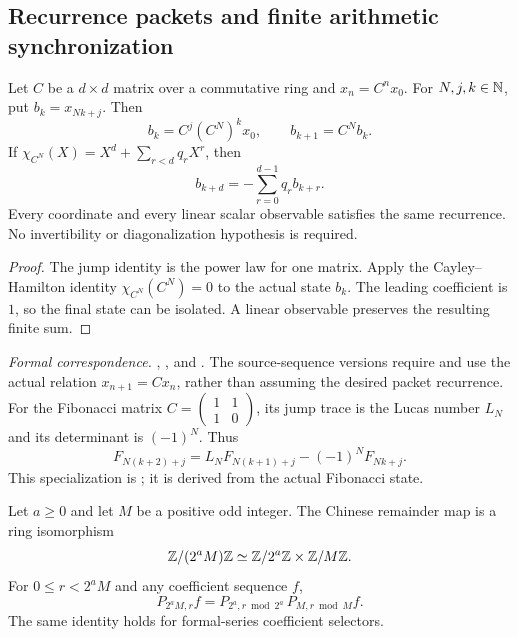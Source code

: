 \subsection{Recurrence packets and finite arithmetic synchronization}

\begin{theorem}
\label{thm:companion-foundation}
Let $C$ be a $d\times d$ matrix over a commutative ring and
$x_n=C^n x_0$. For $N,j,k\in\mathbb N$, put $b_k=x_{Nk+j}$. Then
\[
b_k=C^j(C^N)^kx_0,\qquad b_{k+1}=C^Nb_k.
\]
If $\chi_{C^N}(X)=X^d+\sum_{r<d}q_rX^r$, then
\[
b_{k+d}=-\sum_{r=0}^{d-1}q_r b_{k+r}.
\]
Every coordinate and every linear scalar observable satisfies the same
recurrence. No invertibility or diagonalization hypothesis is required.
\end{theorem}

\begin{proof}
The jump identity is the power law for one matrix. Apply the
Cayley--Hamilton identity $\chi_{C^N}(C^N)=0$ to the actual state $b_k$.
The leading coefficient is $1$, so the final state can be isolated. A linear
observable preserves the resulting finite sum.
\end{proof}

\begingroup\small\raggedright
\noindent\emph{Formal correspondence.}
,
, and
.
The source-sequence versions require and use the actual relation
$x_{n+1}=Cx_n$, rather than assuming the desired packet recurrence.
For the Fibonacci matrix $C=\left(\begin{smallmatrix}1&1\\1&0\end{smallmatrix}\right)$,
its jump trace is the Lucas number $L_N$ and its determinant is $(-1)^N$.
Thus
\[
F_{N(k+2)+j}=L_NF_{N(k+1)+j}-(-1)^NF_{Nk+j}.
\]
This specialization is
; it is derived from the
actual Fibonacci state.
\par\endgroup

\begin{theorem}
\label{thm:crt-foundation}
Let $a\geq0$ and let $M$ be a positive odd integer. The Chinese remainder map
is a ring isomorphism
\[
\mathbb Z/(2^aM)\mathbb Z\simeq\mathbb Z/2^a\mathbb Z\times\mathbb Z/M\mathbb Z.
\]
For $0\leq r<2^aM$ and any coefficient sequence $f$,
\[
P_{2^aM,r}f
=P_{2^a,r\bmod 2^a}\,P_{M,r\bmod M}f.
\]
The same identity holds for formal-series coefficient selectors.
\end{theorem}

